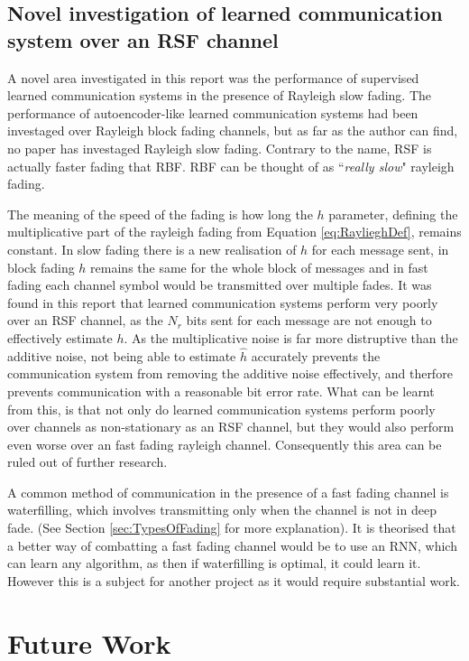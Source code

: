 \documentclass[12pt,onecolumn,letterpaper]{article}
\begin{document}
\subsection{Novel investigation of learned communication system over an RSF channel}

A novel area investigated in this report was the performance of supervised learned communication systems in the presence of Rayleigh slow fading. The performance of autoencoder-like learned communication systems had been investaged over Rayleigh block fading channels, but as far as the author can find, no paper has investaged Rayleigh slow fading. Contrary to the name, RSF is actually faster fading that RBF. RBF can be thought of as ``\textit{really slow}" rayleigh fading. 

The meaning of the speed of the fading is how long the $h$ parameter, defining the multiplicative part of the rayleigh fading from Equation \ref{eq:RaylieghDef}, remains constant. In slow fading there is a new realisation of $h$ for each message sent, in block fading $h$ remains the same for the whole block of messages and in fast fading each channel symbol would be transmitted over multiple fades. It was found in this report that learned communication systems perform very poorly over an RSF channel, as the $N_r$ bits sent for each message are not enough to effectively estimate $h$. As the multiplicative noise is far more distruptive than the additive noise, not being able to estimate $\hat{h}$ accurately prevents the communication system from removing the additive noise effectively, and therfore prevents communication with a reasonable bit error rate. What can be learnt from this, is that not only do learned communication systems perform poorly over channels as non-stationary as an RSF channel, but they would also perform even worse over an fast fading rayleigh channel. Consequently this area can be ruled out of further research. 

A common method of communication in the presence of a fast fading channel is waterfilling, which involves transmitting only when the channel is not in deep fade. (See Section \ref{sec:TypesOfFading} for more explanation). It is theorised that a better way of combatting a fast fading channel would be to use an RNN, which can learn any algorithm, as then if waterfilling is optimal, it could learn it. However this is a subject for another project as it would require substantial work.

\FloatBarrier
\section{Future Work}
\end{document}
